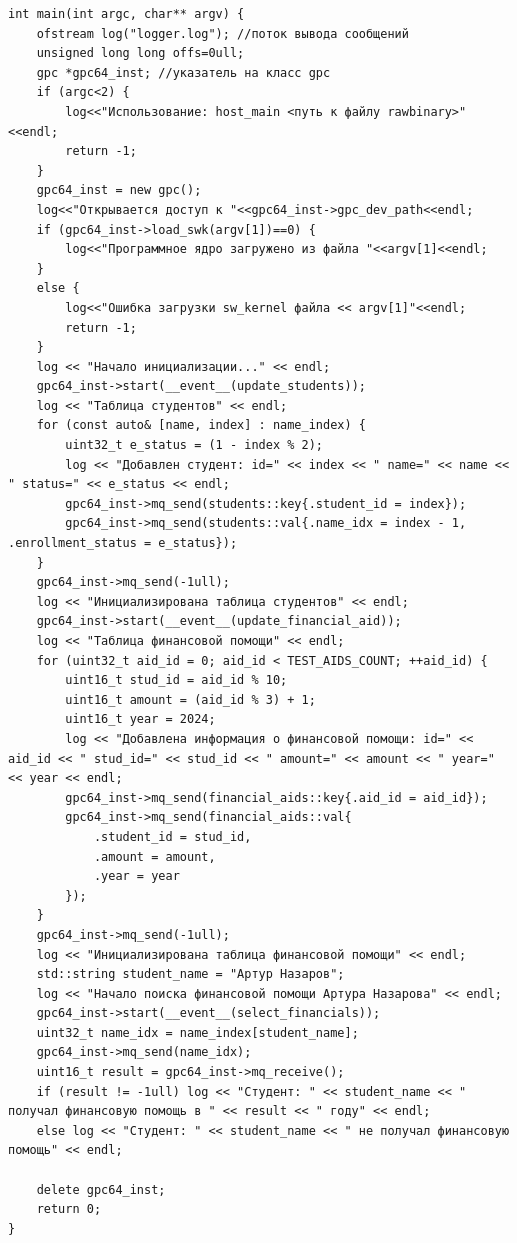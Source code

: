 \documentclass{article}
\begin{document}
\begin{lstlisting}[style=lang, label=host, caption=Описание хост-подсистемы]
int main(int argc, char** argv) {
	ofstream log("logger.log"); //поток вывода сообщений
	unsigned long long offs=0ull;
	gpc *gpc64_inst; //указатель на класс gpc
	if (argc<2) {
		log<<"Использование: host_main <путь к файлу rawbinary>"<<endl;
		return -1;
	}
	gpc64_inst = new gpc();
	log<<"Открывается доступ к "<<gpc64_inst->gpc_dev_path<<endl;
	if (gpc64_inst->load_swk(argv[1])==0) {
		log<<"Программное ядро загружено из файла "<<argv[1]<<endl;
	}
	else {
		log<<"Ошибка загрузки sw_kernel файла << argv[1]"<<endl;
		return -1;
	}
    log << "Начало инициализации..." << endl;
	gpc64_inst->start(__event__(update_students));
    log << "Таблица студентов" << endl;
    for (const auto& [name, index] : name_index) {
        uint32_t e_status = (1 - index % 2);
        log << "Добавлен студент: id=" << index << " name=" << name << " status=" << e_status << endl;
        gpc64_inst->mq_send(students::key{.student_id = index});
        gpc64_inst->mq_send(students::val{.name_idx = index - 1, .enrollment_status = e_status});
    }
    gpc64_inst->mq_send(-1ull);
    log << "Инициализирована таблица студентов" << endl;
    gpc64_inst->start(__event__(update_financial_aid));
    log << "Таблица финансовой помощи" << endl;
    for (uint32_t aid_id = 0; aid_id < TEST_AIDS_COUNT; ++aid_id) {
        uint16_t stud_id = aid_id % 10;
        uint16_t amount = (aid_id % 3) + 1;
        uint16_t year = 2024;
        log << "Добавлена информация о финансовой помощи: id=" << aid_id << " stud_id=" << stud_id << " amount=" << amount << " year=" << year << endl;
        gpc64_inst->mq_send(financial_aids::key{.aid_id = aid_id});
        gpc64_inst->mq_send(financial_aids::val{
            .student_id = stud_id,
            .amount = amount,
            .year = year
        });
    }
    gpc64_inst->mq_send(-1ull);
    log << "Инициализирована таблица финансовой помощи" << endl;   
    std::string student_name = "Артур Назаров";
    log << "Начало поиска финансовой помощи Артура Назарова" << endl;
    gpc64_inst->start(__event__(select_financials));
    uint32_t name_idx = name_index[student_name];
    gpc64_inst->mq_send(name_idx);
    uint16_t result = gpc64_inst->mq_receive();
    if (result != -1ull) log << "Студент: " << student_name << " получал финансовую помощь в " << result << " году" << endl;
    else log << "Студент: " << student_name << " не получал финансовую помощь" << endl;
    
    delete gpc64_inst;
    return 0;
}
\end{lstlisting}
\end{document}
